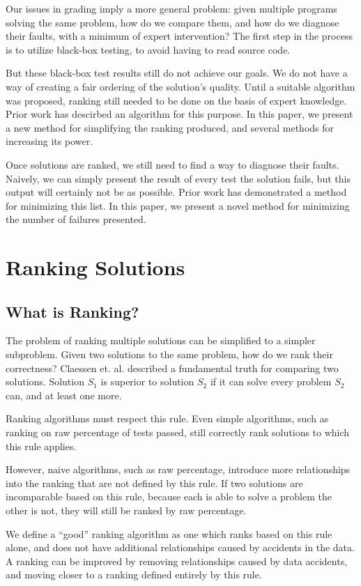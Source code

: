 \documentclass[11pt,twoside]{article}
\theoremstyle{definition}
\let\cite=\citep
\begin{document}
Our issues in grading imply a more general problem: given multiple programs solving the same problem, how do we compare them, and how do we diagnose their faults, with a minimum of expert intervention? The first step in the process is to utilize black-box testing, to avoid having to read source code.

But these black-box test results still do not achieve our goals. We do not have a way of creating a fair ordering of the solution's quality. Until a suitable algorithm was proposed, ranking still needed to be done on the basis of expert knowledge. Prior work has descirbed an algorithm for this purpose. In this paper, we present a new method for simplifying the ranking produced, and several methods for increasing its power.

Once solutions are ranked, we still need to find a way to diagnose their faults. Naively, we can simply present the result of every test the solution fails, but this output will certainly not be as possible. Prior work has demonstrated a method for minimizing this list. In this paper, we present a novel method for minimizing the number of failures presented.

\section{Ranking Solutions}
\subsection{What is Ranking?}

The problem of ranking multiple solutions can be simplified to a simpler subproblem. Given two solutions to the same problem, how do we rank their correctness? Claessen et. al. \cite{Claessen} described a fundamental truth for comparing two solutions. Solution $S_1$ is superior to solution $S_2$ if it can solve every problem $S_2$ can, and at least one more.

Ranking algorithms must respect this rule. Even simple algorithms, such as ranking on raw percentage of tests passed, still correctly rank solutions to which this rule applies. 

However, naive algorithms, such as raw percentage, introduce more relationships into the ranking that are not defined by this rule. If two solutions are incomparable based on this rule, because each is able to solve a problem the other is not, they will still be ranked by raw percentage.

We define a ``good'' ranking algorithm as one which ranks based on this rule alone, and does not have additional relationships caused by accidents in the data. A ranking can be improved by removing relationships caused by data accidents, and moving closer to a ranking defined entirely by this rule.
\end{document}
